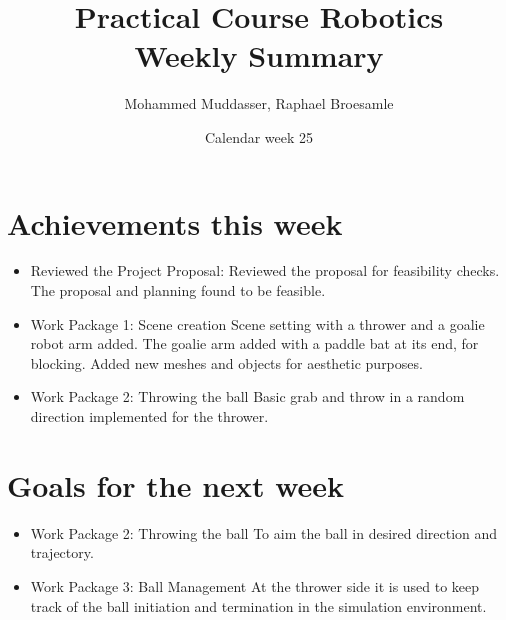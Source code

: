 \documentclass[12pt,pdftex,a4paper]{article}
\begin{document}
\title{Practical Course Robotics\\Weekly Summary}
\author{Mohammed Muddasser, Raphael Broesamle}
\date{Calendar week 25}
\maketitle

\section*{Achievements this week}
\begin{itemize}
\item
Reviewed the Project Proposal: Reviewed the proposal for feasibility checks. The proposal and planning found to be feasible.

\item
Work Package 1: Scene creation
Scene setting with a thrower and a goalie robot arm added. The goalie arm added with a paddle bat at its end, for blocking. Added new meshes and objects for aesthetic purposes.

\item
Work Package 2: Throwing the ball
Basic grab and throw in a random direction implemented for the thrower.

\end{itemize}

\section*{Goals for the next week}
\begin{itemize}
\item
Work Package 2: Throwing the ball
To aim the ball in desired direction and trajectory.

\item
Work Package 3: Ball Management
At the thrower side it is
used to keep track of the ball initiation and termination in the simulation environment. 

\end{itemize}

\end{document}
